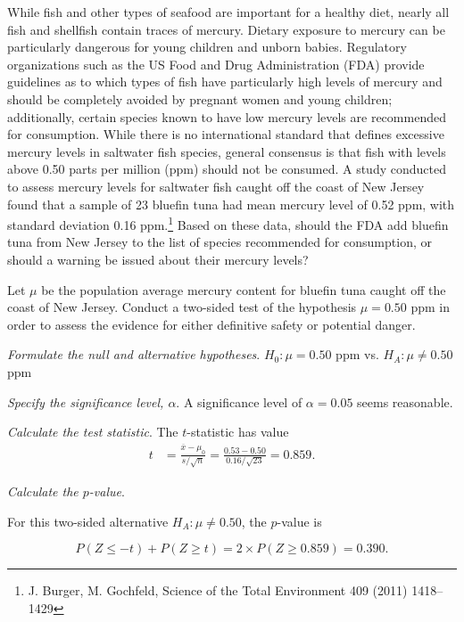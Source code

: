 \begin{example}
{While fish and other types of seafood are important for a healthy diet, nearly all fish and shellfish contain traces of mercury. Dietary exposure to mercury can be particularly dangerous for young children and unborn babies. Regulatory organizations such as the US Food and Drug Administration (FDA) provide guidelines as to which types of fish have particularly high levels of mercury and should be completely avoided by pregnant women and young children; additionally, certain species known to have low mercury levels are recommended for consumption. While there is no international standard that defines excessive mercury levels in saltwater fish species, general consensus is that fish with levels above 0.50 parts per million (ppm) should not be consumed. A study conducted to assess mercury levels for saltwater fish caught off the coast of New Jersey found that a sample of 23 bluefin tuna had mean mercury level of 0.52 ppm, with standard deviation 0.16 ppm.\footnote{J. Burger, M. Gochfeld, Science of the Total Environment 409 (2011) 1418–1429} Based on these data, should the FDA add bluefin tuna from New Jersey to the list of species recommended for consumption, or should a warning be issued about their mercury levels?}
\label{hypTestTuna}

Let $\mu$ be the population average mercury content for bluefin tuna caught off the coast of New Jersey. Conduct a two-sided test of the hypothesis $\mu = 0.50$ ppm in order to assess the evidence for either definitive safety or potential danger.

\textit{Formulate the null and alternative hypotheses}. $H_0: \mu = 0.50$ ppm vs. $H_A: \mu \neq 0.50$ ppm

\textit{Specify the significance level, $\alpha$}.  A significance level of $\alpha = 0.05$ seems reasonable. 

\textit{Calculate the test statistic}. The  $t$-statistic has value
\begin{align*}
t &= \frac{\overline{x}-\mu_0}{s/\sqrt{n}} = \frac{0.53 - 0.50} {0.16/\sqrt{23}} = 0.859.
\end{align*}

\textit{Calculate the $p$-value}.

For this two-sided alternative $H_A: \mu \neq 0.50$, the $p$-value is 

\[P(Z \leq -t) + P(Z \geq t)= 2 \times P(Z \geq 0.859) = 0.390.\]


\end{example}
